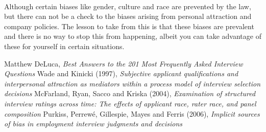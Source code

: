 \documentclass[a4paper,12pt]{report}
\begin{document}
\paragraph{}
Although certain biases like gender, culture and race are prevented by the law, but there can not be a check to the biases
arising from personal attraction and company policies.
The lesson to take from this is that these biases are prevalent and there is no way to stop this from happening,
albeit you can take advantage of these for yourself in certain situations.
\begin{thebibliography}{9}
  Matthew DeLuca,
  \emph{Best Answers to the 201 Most Frequently Asked Interview Questions}
  Wade and Kinicki (1997),
  \emph{Subjective applicant qualifications and interpersonal attraction as mediators within a process model of interview selection decisions}
  McFarland, Ryan, Sacco and Kriska (2004),
  \emph{Examination of structured interview ratings across time: The effects of applicant race, rater race, and panel composition}
  Purkiss, Perrewé, Gillespie, Mayes and Ferris (2006),
  \emph{Implicit sources of bias in employment interview judgments and decisions}
\end{thebibliography}
\end{document}
